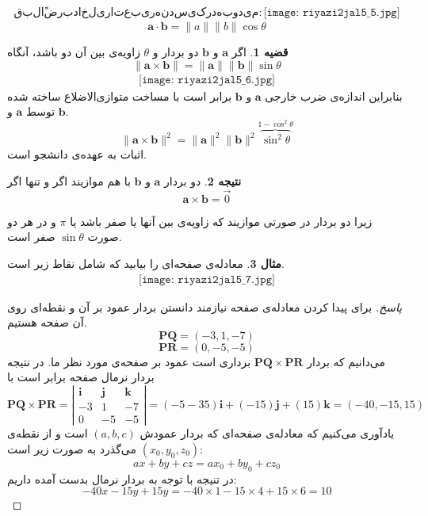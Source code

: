 \documentclass[12pt,a4paper]{article}
\theoremstyle{definition}
\newtheorem{thm}{قضیه}
\newtheorem{mesal}[thm]{مثال}
\newtheorem{cor}[thm]{نتیجه}
\begin{document}
\begin{align*}
قبلاً ضرب داخلی را تعبیر هندسی کرده‌ بودیم:
\texttt{[image: riyazi2jal5\_5.jpg]}
\end{align*}
\[
\mathbf{a} \cdot \mathbf{b}=\|a\| \|b\| \cos \theta
\]
\begin{thm}
اگر 
$\mathbf{a}$
و
$\mathbf{b}$
دو بردار و 
$\theta$
زاویه‌ی بین آن دو باشد، آنگاه 
\[
\|\mathbf{a} \times \mathbf{b} \|=\|\mathbf{a}\| \|\mathbf{b}\| \sin \theta
\]
\begin{align*}
\texttt{[image: riyazi2jal5\_6.jpg]}
\end{align*}
بنابراین اندازه‌ی ضرب خارجی 
$\mathbf{a}$
و
$\mathbf{b}$
برابر است با مساخت متوازی‌الاضلاع ساخته شده توسط
$\mathbf{a}$
و
$\mathbf{b}$.
\[
\|\mathbf{a} \times \mathbf{b} \|^2=\|\mathbf{a}\|^2 \|\mathbf{b}\|^2 \overbrace{\sin^2 \theta}^{1-\cos^2 \theta}
\]
اثبات به عهده‌ی دانشجو است.
\end{thm}
\begin{cor}
دو بردار 
$\mathbf{a}$
و
$\mathbf{b}$
با هم موازیند اگر و تنها اگر
\[
\mathbf{a} \times \mathbf{b}=\overrightarrow{0}
\]
\end{cor}
زیرا دو بردار در صورتی موازیند که زاویه‌ی بین آنها یا صفر باشد یا 
$\pi$
و در هر دو صورت
$\sin \theta$
صفر است.
\begin{mesal}
معادله‌ی صفحه‌ای را بیابید که شامل نقاط زیر است.
\begin{align*}
\texttt{[image: riyazi2jal5\_7.jpg]}
\end{align*}
\end{mesal}
\begin{proof}[پاسخ]
برای پیدا کردن معادله‌ی صفحه نیازمند دانستن بردار عمود بر آن و نقطه‌ای روی آن صفحه هستیم.
\[
\mathbf{PQ} = (-3,1,-7)
\]
\[
\mathbf{PR} = (0,-5,-5)
\]
می‌دانیم که بردار 
$\mathbf{PQ} \times \mathbf{PR}$
برداری است عمود بر صفحه‌ی مورد نظر ما.
در نتیجه بردار نرمال صفحه برابر است با
\[
\mathbf{PQ} \times \mathbf{PR}=\left|\begin{array}{ccc}
\mathbf{i} & \mathbf{j} & \mathbf{k} \\
-3 & 1 & -7 \\
0 & -5 & -5
\end{array}
\right|
=(-5-35)\mathbf{i}+(-15)\mathbf{j}+(15)\mathbf{k}=(-40,-15,15)
\]
یادآوری می‌کنیم که
معادله‌ی صفحه‌ای که بردار عمودش 
$(a,b,c)$
است و از نقطه‌ی 
$(x_0,y_0,z_0)$
می‌گذرد به صورت زیر است:
\[
ax+by+cz=ax_0+by_0+cz_0
\]
در تنیجه با توجه به بردار نرمال بدست آمده داریم:
\[
-40x-15y+15y=-40 \times 1-15 \times 4+15 \times 6=10
\]
\end{proof}
\end{document}
